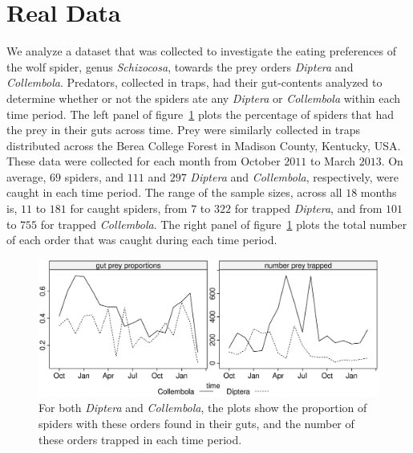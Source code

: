 \section{Real Data}
\label{sec:data}

We analyze a dataset that was collected to investigate the eating preferences of the wolf spider, genus \textit{Schizocosa}, towards the prey orders \textit{Diptera} and \textit{Collembola}.  Predators, collected in traps, had their gut-contents analyzed to determine whether or not the spiders ate any \textit{Diptera} or \textit{Collembola} within each time period.  The left panel of figure~\ref{fig:data} plots the percentage of spiders that had the prey in their guts across time.  Prey were similarly collected in traps distributed across the Berea College Forest in Madison County, Kentucky, USA.  These data were collected for each month from October $2011$ to March $2013$.  On average, $69$ spiders, and $111$ and $297$ \textit{Diptera} and \textit{Collembola}, respectively, were caught in each time period.  The range of the sample sizes, across all $18$ months is, $11$ to $181$ for caught spiders, from $7$ to $322$ for trapped \textit{Diptera}, and from $101$ to $755$ for trapped \textit{Collembola}.  The right panel of figure~\ref{fig:data} plots the total number of each order that was caught during each time period. 

\begin{figure}
  \centering
  \includegraphics[scale=0.5]{data}
  \caption{For both \textit{Diptera} and \textit{Collembola}, the plots show the proportion of spiders with these orders found in their guts, and the number of these orders trapped in each time period.}
  \label{fig:data}
\end{figure}


